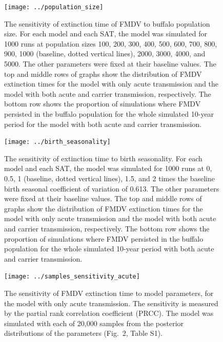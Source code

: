 \documentclass[12pt, USenglish]{article}  %
\begin{document}
\begin{figure}
  \centering
  \texttt{[image: ../population\_size]}
  \caption{The sensitivity of extinction time of FMDV to buffalo
    population size.
    For each model and each SAT, the model was simulated for 1000 runs
    at population sizes 100, 200, 300, 400, 500, 600, 700, 800, 900,
    1000 (baseline, dotted vertical lines), 2000, 3000, 4000, and
    5000.
    The other parameters were fixed at their baseline values.
    The top and middle rows of graphs show the distribution of
    FMDV extinction times for the model with only acute transmission
    and the model with both acute and carrier transmission,
    respectively.
    The bottom row shows the proportion of simulations where FMDV
    persisted in the buffalo population for the whole simulated
    10-year period for the model with both acute and carrier
    transmission.}
\end{figure}


\begin{figure}
  \centering
  \texttt{[image: ../birth\_seasonality]}
  \caption{The sensitivity of extinction time to birth seasonality.
    For each model and each SAT, the model was simulated for
    1000 runs at 0, 0.5, 1 (baseline, dotted vertical lines), 1.5, and
    2 times the baseline birth seasonal coefficient of variation of
    0.613.
    The other parameters were fixed at their baseline values.
    The top and middle rows of graphs show the distribution of
    FMDV extinction times for the model with only acute transmission
    and the model with both acute and carrier transmission,
    respectively.
    The bottom row shows the proportion of simulations where FMDV
    persisted in the buffalo population for the whole simulated
    10-year period with both acute and carrier transmission.}
\end{figure}


\begin{figure}
  \centering
  \texttt{[image: ../samples\_sensitivity\_acute]}
  \caption{The sensitivity of FMDV extinction time to model
    parameters, for the model with only acute transmission.
    The sensitivity is measured by the partial rank correlation
    coefficient (PRCC). The model was simulated with each of 20,000
    samples from the posterior distributions of the parameters
    (Fig.~2, Table S1).}
\end{figure}
\end{document}
